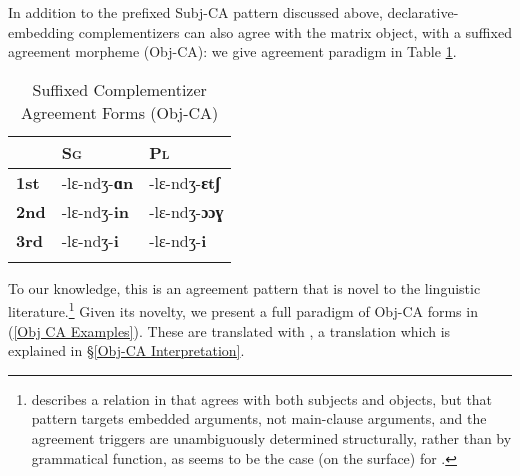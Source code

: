 \documentclass[output=paper
,newtxmath
,modfonts
,nonflat]{langsci/langscibook}
\begin{document}
In addition to the prefixed Subj-CA pattern discussed above,  declarative-embedding complementizers can also agree with the matrix object, with a suffixed agreement morpheme (Obj-CA): we give agreement paradigm in Table \ref{Obj CA Forms Table}. 

\pagebreak

\begin{table}
\caption{Suffixed Complementizer Agreement Forms (Obj-CA)}
\label{Obj CA Forms Table}
 \begin{tabular}{lll} 
  \lsptoprule
   {} & \textsc{Sg} & \textsc{Pl} \\ 
  \midrule
   \textbf{1st} & -lɛ-ndʒ-\textbf{ɑn} & -lɛ-ndʒ-\textbf{ɛtʃ} \\
   \textbf{2nd} & -lɛ-ndʒ-\textbf{in} & -lɛ-ndʒ-\textbf{ɔɔɣ} \\
   \textbf{3rd} & -lɛ-ndʒ-\textbf{i} & -lɛ-ndʒ-\textbf{i} \\
  \lspbottomrule
 \end{tabular}
\end{table}

\noindent To our knowledge, this is an agreement pattern that is novel to the linguistic literature.\footnote{\citet{Deal:2015} describes a  relation in  that agrees with both subjects and objects, but that pattern targets embedded arguments, not main-clause arguments, and the agreement triggers are unambiguously determined structurally, rather than by grammatical function, as seems to be the case (on the surface) for .}  Given its novelty, we present a full paradigm of Obj-CA forms in (\ref{Obj CA Examples}). These are translated with , a translation which is explained in \S \ref{Obj-CA Interpretation}. 
\end{document}
